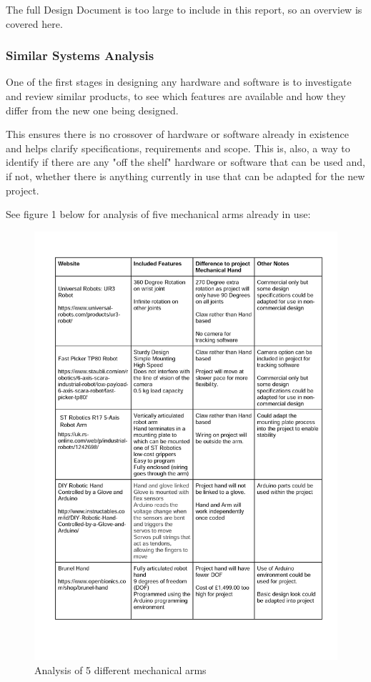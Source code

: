 \documentclass[progress]{cmpreport}
\begin{document}
The full Design Document is too large to include in this report, so an overview is covered here.

\subsubsection{Similar Systems Analysis}
One of the first stages in designing any hardware and software is to investigate and review similar products, to see which features are available and how they differ from the new one being designed. 

This ensures there is no crossover of hardware or software already in existence and helps clarify specifications, requirements and scope. This is, also, a way to identify if there are any "off the shelf" hardware or software that can be used and, if not, whether there is anything currently in use that can be adapted for the new project.

See figure 1 below for analysis of five mechanical arms already in use:

\begin{figure}[H] 
	\caption{Analysis of 5 different mechanical arms}
	\centering
	\includegraphics[trim=0cm 2.8cm 0cm 0.15cm, width=1 \textwidth, height=0.75 \textheight]{photos/SSA.jpg}
\end{figure}
\end{document}
